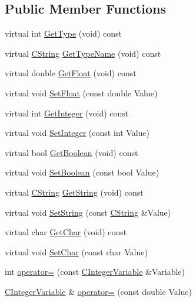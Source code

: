 \subsection*{Public Member Functions}
\begin{DoxyCompactItemize}
\item 
virtual int \hyperlink{classCIntegerVariable_aed1d50a3a0570877bbfd1c942214209b}{Get\-Type} (void) const 
\item 
virtual \hyperlink{classCString}{C\-String} \hyperlink{classCIntegerVariable_aab3fb2ea2f634ccfc965d7adfeabab8a}{Get\-Type\-Name} (void) const 
\item 
virtual double \hyperlink{classCIntegerVariable_a5b993f4518f52b3b0c109b7bc74389ee}{Get\-Float} (void) const 
\item 
virtual void \hyperlink{classCIntegerVariable_ac5a68b16aba5348cc4a563c2771eda02}{Set\-Float} (const double Value)
\item 
virtual int \hyperlink{classCIntegerVariable_a24cfccaf406f0bd652241e2e0f2e928a}{Get\-Integer} (void) const 
\item 
virtual void \hyperlink{classCIntegerVariable_a2e00b834d4019241da2a32b8a7ad4a64}{Set\-Integer} (const int Value)
\item 
virtual bool \hyperlink{classCIntegerVariable_a62362a25f9cab7a3aba600ca42666bfa}{Get\-Boolean} (void) const 
\item 
virtual void \hyperlink{classCIntegerVariable_aceb8db208cad92ea4c7846fe2c0992d0}{Set\-Boolean} (const bool Value)
\item 
virtual \hyperlink{classCString}{C\-String} \hyperlink{classCIntegerVariable_a44c1bda15c10f0161046adf9c81d54d4}{Get\-String} (void) const 
\item 
virtual void \hyperlink{classCIntegerVariable_aa66b305e3ced11d63c64e7400f4d0434}{Set\-String} (const \hyperlink{classCString}{C\-String} \&Value)
\item 
virtual char \hyperlink{classCIntegerVariable_a93944292c5605b75906dbb2f55c0ab38}{Get\-Char} (void) const 
\item 
virtual void \hyperlink{classCIntegerVariable_a02ad451cbd589022a0761d3e8c62280c}{Set\-Char} (const char Value)
\item 
int \hyperlink{classCIntegerVariable_a434336429ffa52bb8bc1b9281a380b91}{operator=} (const \hyperlink{classCIntegerVariable}{C\-Integer\-Variable} \&Variable)
\item 
\hyperlink{classCIntegerVariable}{C\-Integer\-Variable} \& \hyperlink{classCIntegerVariable_ad2b015e2ab95995c4d3ace9712e0e98d}{operator=} (const double Value)

\end{DoxyCompactItemize}
